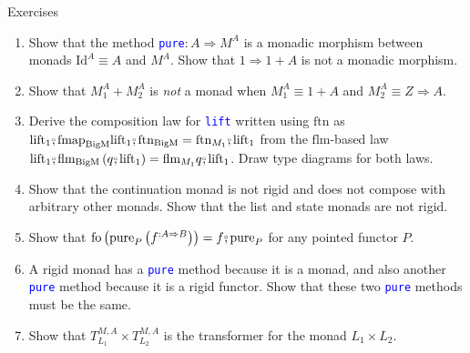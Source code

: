 \documentclass[english]{beamer}
\newcommand{\bef}{\ensuremath\raisebox{2pt}{$\mathsmaller{\mathsmaller{\circ}}$}\hspace{-3.3pt},}
\begin{document}
\begin{frame}{Exercises}
\begin{enumerate}
\item {\small{}Show that the method }\texttt{\textcolor{blue}{\footnotesize{}pure}}{\small{}$:A\Rightarrow M^{A}$
is a monadic morphism between monads $\text{Id}^{A}\equiv A$ and
$M^{A}$. Show that $1\Rightarrow1+A$ is not a monadic morphism.}{\small\par}
\item {\small{}Show that $M_{1}^{A}+M_{2}^{A}$ is }\emph{\small{}not}{\small{}
a monad when $M_{1}^{A}\equiv1+A$ and $M_{2}^{A}\equiv Z\Rightarrow A$.}{\small\par}
\item {\small{}Derive the composition law for }\texttt{\textcolor{blue}{\footnotesize{}lift}}{\small{}
written using $\text{ftn}$ as $\text{lift}_{1}\bef\text{fmap}_{\text{BigM}}\text{lift}_{1}\bef\text{ftn}_{\text{BigM}}=\text{ftn}_{M_{1}}\bef\text{lift}_{1}$
from the $\text{flm}$-based law $\text{lift}_{1}\bef\text{flm}_{\text{BigM}}\left(q\bef\text{lift}_{1}\right)=\text{flm}_{M_{1}}q\bef\text{lift}_{1}$.
Draw type diagrams for both laws.}{\small\par}
\item {\small{}Show that the continuation monad is not rigid and does not
compose with arbitrary other monads. Show that the list and state
monads are not rigid.}{\small\par}
\item {\small{}Show that }{\footnotesize{}$\text{fo}\left(\text{pure}_{P}\left(f^{:A\Rightarrow B}\right)\right)=f\bef\text{pure}_{P}$}{\small{}
for any pointed functor $P$.}{\small\par}
\item {\small{}A rigid monad has a }\texttt{\textcolor{blue}{\footnotesize{}pure}}{\small{}
method because it is a monad, and also another }\texttt{\textcolor{blue}{\footnotesize{}pure}}{\small{}
method because it is a rigid functor. Show that these two }\texttt{\textcolor{blue}{\footnotesize{}pure}}{\small{}
methods must be the same.}{\small\par}
\item {\small{}Show that $T_{L_{1}}^{M,A}\times T_{L_{2}}^{M,A}$ is the
transformer for the monad $L_{1}\times L_{2}$.} 
\end{enumerate}
\end{frame}
\end{document}
